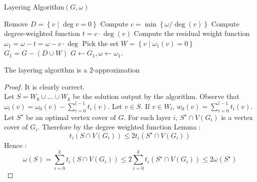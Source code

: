 \documentclass{cours}
\begin{document}
\begin{algorithm}
    \caption{Layering Algorithm$(G, \omega)$}
    \begin{algorithmic}
            \State Remove $D = \left\{v \mid \deg v = 0\right\}$
            \State Compute $c = \min \left\{\omega/\deg(v)\right\}$
            \State Compute degree-weighted function $t = c \cdot \deg(v)$
            \State Compute the residual weight function $\omega_{1} = \omega - t = \omega- c \cdot \deg$ 
            \State Pick the set $W = \left\{v \mid \omega_{1}(v) = 0\right\}$
            \State $G_{1} = G - \left(D \cup W\right)$
            \State $G \gets G_{1}, \omega \gets \omega_{1}$.
        \EndWhile
    \end{algorithmic}
\end{algorithm}

\begin{theorem}
    The layering algorithm is a $2$-approximation
\end{theorem}
\begin{proof}
    It is clearly correct.\\
    Let $S = W_{0} \cup \ldots \cup W_{k}$ be the solution output by the algorithm. Observe that $\omega_{l}(v) = \omega_{0}(v) - \sum_{i = 0}^{l- 1}t_{i}(v)$. Let $v \in S$. If $v \in W_{l}$, $w_{0}(v) = \sum_{i = 0}^{l - 1}t_{i}(v)$.\\
    Let $S^{\star}$ be an optimal vertex cover of $G$. For each layer $i$, $S^{\star} \cap V\left(G_{i}\right)$ is a vertex cover of $G_{i}$. Therefore by the degree weighted function Lemma : 
    \[
        t_{i}\left(S\cap V(G_{i})\right) \leq 2 t_{i}\left(S^{\star} \cap V(G_{i})\right)
    \]
    Hence : 
    \[
        \omega(S) = \sum_{i = 0}^{k} t_{i}\left(S \cap V(G_{i})\right) \leq 2 \sum_{i = 0}^{k} t_{i}(S^{\star} \cap V(G_{i})) \leq 2 \omega(S^{\star})
    \]
\end{proof}
\end{document}

